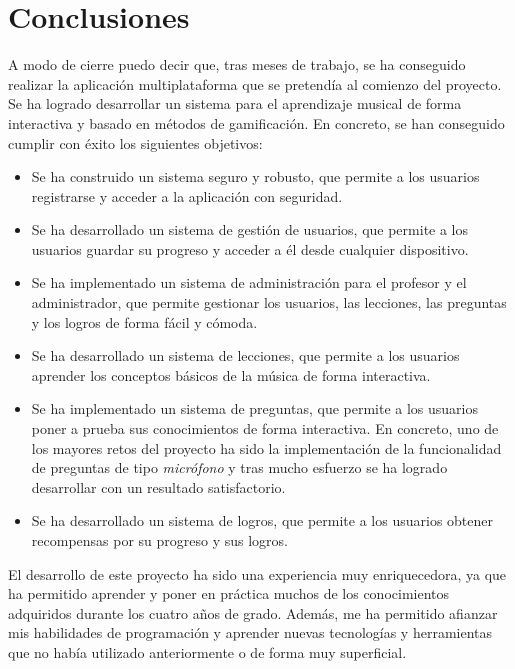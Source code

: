 \chapter{Conclusiones}
\label{cap:conclusiones}
A modo de cierre puedo decir que, tras meses de trabajo, se ha conseguido realizar la aplicación multiplataforma que se pretendía al comienzo del proyecto. 
Se ha logrado desarrollar un sistema para el aprendizaje musical de forma interactiva y basado en métodos de gamificación. En concreto, se han conseguido cumplir con éxito
los siguientes objetivos:
\begin{itemize}
    \item Se ha construido un sistema seguro y robusto, que permite a los usuarios registrarse y acceder a la aplicación con seguridad.
    \item Se ha desarrollado un sistema de gestión de usuarios, que permite a los usuarios guardar su progreso y acceder a él desde cualquier dispositivo.
    \item Se ha implementado un sistema de administración para el profesor y el administrador, que permite gestionar los usuarios, las lecciones, las preguntas y los logros de forma fácil y cómoda.
    \item Se ha desarrollado un sistema de lecciones, que permite a los usuarios aprender los conceptos básicos de la música de forma interactiva.
    \item Se ha implementado un sistema de preguntas, que permite a los usuarios poner a prueba sus conocimientos de forma interactiva. En concreto, uno de los mayores retos del proyecto ha sido la implementación de la funcionalidad de preguntas de tipo \textit{micrófono} y tras mucho
    esfuerzo se ha logrado desarrollar con un resultado satisfactorio.
    \item Se ha desarrollado un sistema de logros, que permite a los usuarios obtener recompensas por su progreso y sus logros.
\end{itemize}

El desarrollo de este proyecto ha sido una experiencia muy enriquecedora, ya que ha permitido aprender y poner en práctica muchos de los conocimientos adquiridos durante los cuatro años de grado. Además, me ha permitido afianzar mis habilidades de programación y aprender nuevas tecnologías y herramientas que no había utilizado anteriormente o de forma muy superficial.


